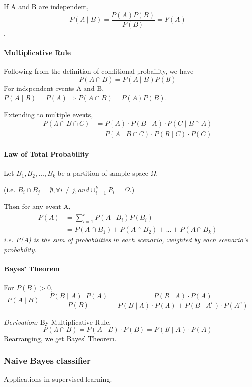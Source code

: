 \documentclass[../Probability.tex]{subfiles}
\begin{document}
If A and B are independent, \[P(A \mid B) = \frac{P(A)P(B)}{P(B)} = P(A)\].

\newpage

\paragraph{Multiplicative Rule}
Following from the definition of conditional probaility, we have
\[ P(A \cap B) = P(A \mid B)P(B) \]
For independent events A and B, $P(A\mid B) = P(A) \Rightarrow P(A \cap B) = P(A)P(B).$

\medskip

\noindent Extending to multiple events,
\begin{align*}
    P(A \cap B \cap C) &= P(A)\cdot P(B \mid A)\cdot P(C \mid B \cap A) \\
                       &= P(A \mid B \cap C) \cdot P(B \mid C) \cdot P(C)
\end{align*}

\paragraph{Law of Total Probability}

Let $B_1, B_2, \ldots, B_k$ be a partition of sample space $\Omega$.

\noindent(i.e. $B_i \cap B_j = \emptyset, \forall i \neq j, and \cup_{i=1}^{k}B_{i} = \Omega.$)

\noindent Then for any event A,
\begin{align*}
    P(A) &= \sum_{i=1}^{k} P(A \mid B_{i})P(B_{i})\\
    &= P(A \cap B_1) + P(A \cap B_2) +\ldots + P(A \cap B_k)
\end{align*}
\textit{i.e. P(A) is the sum of probabilities in each scenario, weighted by each scenario's probability.}

\paragraph{Bayes' Theorem}
For $P(B) > 0$, 
\[P(A \mid B) = \frac{P(B \mid A)\cdot P(A)}{P(B)} = \frac{P(B \mid A)\cdot P(A)}{P(B\mid A)\cdot P(A) + P(B\mid A^c)\cdot P(A^c)}\]

\noindent \textit{Derivation:}
By Multiplicative Rule,
\[P(A \cap B) = P(A\mid B)\cdot P(B) = P(B\mid A)\cdot P(A)\]
Rearranging, we get Bayes' Theorem.

\subsubsection{Naive Bayes classifier}
Applications in supervised learning.
\end{document}
